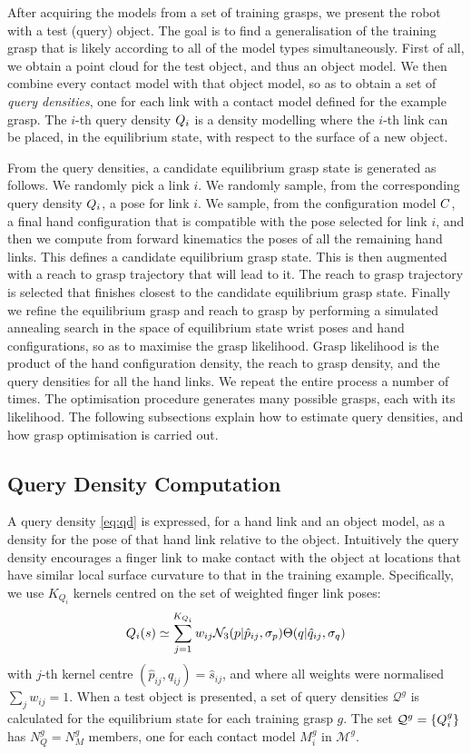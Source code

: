 
After acquiring the models from a set of training grasps, we present the robot with a test (query) object. The goal is to find a generalisation of the training grasp that is likely according to all of the model types simultaneously. First of all, we obtain a point cloud for the test object, and thus an object model. We then combine every contact model with that object model, so as to obtain a set of {\em query densities}, one for each link with a contact model defined for the example grasp. The $i$-th query density $Q_i$ is a density modelling where the $i$-th link can be placed, in the equilibrium state, with respect to the surface of a new object. 

From the query densities, a candidate equilibrium grasp state is generated as follows. We randomly pick a link $i$. We randomly sample, from the corresponding query density $Q_i$, a pose for link $i$. We sample, from the configuration model $C$, a final hand configuration that is compatible with the pose selected for link $i$, and then we compute from forward kinematics the poses of all the remaining hand links. This defines a candidate equilibrium grasp state. This is then augmented with a reach to grasp trajectory that will lead to it. The reach to grasp trajectory is selected that finishes closest to the candidate equilibrium grasp state. Finally we refine the equilibrium grasp and reach to grasp by performing a simulated annealing search in the space of equilibrium state wrist poses and hand configurations, so as to maximise the grasp likelihood. Grasp likelihood is the product of the hand configuration density, the reach to grasp density, and the query densities for all the hand links. We repeat the entire process a number of times. The optimisation procedure generates many possible grasps, each with its likelihood. The following subsections explain how to estimate query densities, and how grasp optimisation is carried out.

\subsection{Query Density Computation}

A query density \eqref{eq:qd} is expressed, for a hand link and an object model, as a density for the pose of that hand link relative to the object. Intuitively the query density encourages a finger link to make contact with the object at locations that have similar local surface curvature to that in the training example. Specifically, we use $K_{Q_i}$ kernels centred on the set of weighted finger link poses:
\begin{equation}
\qd_i(s) \simeq \sum^{K_{Q_i}}_{j=1} w_{ij} \mathcal{N}_3(p|{\hat{p}_{ij}}, \sigma_{p}) \Theta(q|{\hat{q}_{ij}}, \sigma_{q})%
\label{eq:qd.approx}
\end{equation}
with $j$-th kernel centre $({\hat{p}_{ij}}, {\hat{q}_{ij}}) = \hat{s}_{ij}$, and where all weights were normalised $\sum_j w_{ij} = 1$. When a test object is presented, a set of query densities $\mathcal{Q}^g$ is calculated for the equilibrium state for each training grasp $g$. The set $\mathcal{Q}^g =\{Q_i^g\}$ has $N^g_Q=N^g_M$ members, one for each contact model $M_i^g$ in $\mathcal{M}^g$.